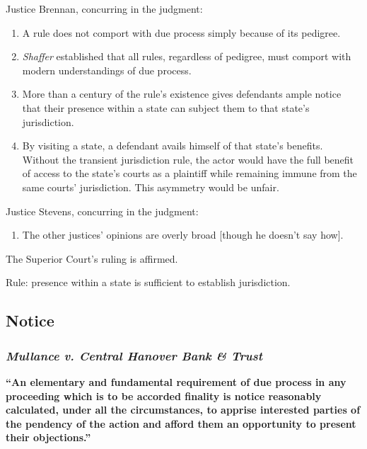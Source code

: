 Justice Brennan, concurring in the judgment:

\begin{enumerate}
\item
  A rule does not comport with due process simply because of its
  pedigree.
\item
  \emph{Shaffer} established that all rules, regardless of pedigree,
  must comport with modern understandings of due process.
\item
  More than a century of the rule's existence gives defendants ample
  notice that their presence within a state can subject them to that
  state's jurisdiction.
\item
  By visiting a state, a defendant avails himself of that state's
  benefits. Without the transient jurisdiction rule, the actor would
  have the full benefit of access to the state's courts as a plaintiff
  while remaining immune from the same courts' jurisdiction. This
  asymmetry would be unfair.
\end{enumerate}

Justice Stevens, concurring in the judgment:

\begin{enumerate}
\item
  The other justices' opinions are overly broad {[}though he doesn't say
  how{]}.
\end{enumerate}

The Superior Court's ruling is affirmed.

Rule: presence within a state is sufficient to establish jurisdiction.


\subsection{Notice}

\subsubsection{\emph{Mullance v. Central Hanover Bank \& Trust}}

\textbf{``An elementary and fundamental requirement of due process in any 
proceeding which is to be accorded finality is notice reasonably calculated, 
under all the circumstances, to apprise interested parties of the pendency of 
the action and afford them an opportunity to present their objections.''}

